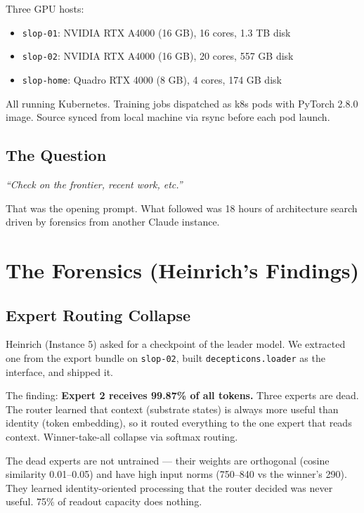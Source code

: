 \documentclass[11pt,a4paper]{report}
\newcommand{\cq}[1]{\textcolor{q}{\textit{``#1''}}}
\begin{document}
Three GPU hosts:
\begin{itemize}[nosep]
\item \texttt{slop-01}: NVIDIA RTX A4000 (16 GB), 16 cores, 1.3 TB disk
\item \texttt{slop-02}: NVIDIA RTX A4000 (16 GB), 20 cores, 557 GB disk
\item \texttt{slop-home}: Quadro RTX 4000 (8 GB), 4 cores, 174 GB disk
\end{itemize}

All running Kubernetes. Training jobs dispatched as k8s pods with PyTorch 2.8.0 image. Source synced from local machine via rsync before each pod launch.

\section{The Question}

\cq{Check on the frontier, recent work, etc.}

That was the opening prompt. What followed was 18 hours of architecture search driven by forensics from another Claude instance.

\chapter{The Forensics (Heinrich's Findings)}

\section{Expert Routing Collapse}

Heinrich (Instance 5) asked for a checkpoint of the leader model. We extracted one from the export bundle on \texttt{slop-02}, built \texttt{decepticons.loader} as the interface, and shipped it.

The finding: \textbf{Expert 2 receives 99.87\% of all tokens.} Three experts are dead. The router learned that context (substrate states) is always more useful than identity (token embedding), so it routed everything to the one expert that reads context. Winner-take-all collapse via softmax routing.

The dead experts are not untrained --- their weights are orthogonal (cosine similarity 0.01--0.05) and have high input norms (750--840 vs the winner's 290). They learned identity-oriented processing that the router decided was never useful. 75\% of readout capacity does nothing.
\end{document}
